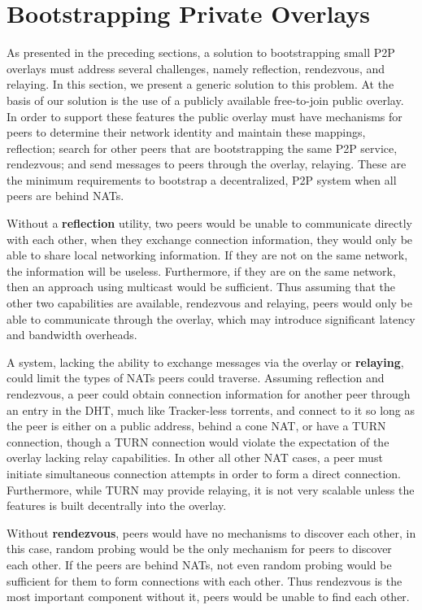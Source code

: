 \documentclass[conference]{IEEEtran}
\begin{document}
\section{Bootstrapping Private Overlays}
\label{overview}

As presented in the preceding sections, a solution to bootstrapping small P2P
overlays must address several challenges, namely reflection, rendezvous, and
relaying.  In this section, we present a generic solution to this problem.  At
the basis of our solution is the use of a publicly available free-to-join
public overlay.  In order to support these features the public overlay must
have mechanisms for peers to determine their network identity and maintain
these mappings, reflection; search for other peers that are bootstrapping the
same P2P service, rendezvous; and send messages to peers through the overlay,
relaying.  These are the minimum requirements to bootstrap a decentralized, P2P
system when all peers are behind NATs.  

Without a \textbf{reflection} utility, two peers would be unable to communicate
directly with each other, when they exchange connection information, they would
only be able to share local networking information.  If they are not on the
same network, the information will be useless.  Furthermore, if they are on the
same network, then an approach using multicast would be sufficient.  Thus
assuming that the other two capabilities are available, rendezvous and
relaying, peers would only be able to communicate through the overlay, which
may introduce significant latency and bandwidth overheads.  

A system, lacking the ability to exchange messages via the overlay or
\textbf{relaying}, could limit the types of NATs peers could traverse.
Assuming reflection and rendezvous, a peer could obtain connection information
for another peer through an entry in the DHT, much like Tracker-less torrents,
and connect to it so long as the peer is either on a public address, behind a
cone NAT, or have a TURN connection, though a TURN connection would violate the
expectation of the overlay lacking relay capabilities.  In other all other NAT
cases, a peer must initiate simultaneous connection attempts in order to form a
direct connection.  Furthermore, while TURN may provide relaying, it is not
very scalable unless the features is built decentrally into the overlay.

Without \textbf{rendezvous}, peers would have no mechanisms to discover each
other, in this case, random probing would be the only mechanism for peers to
discover each other.  If the peers are behind NATs, not even random probing
would be sufficient for them to form connections with each other.  Thus
rendezvous is the most important component without it, peers would be unable to
find each other.
\end{document}
